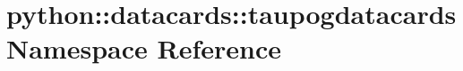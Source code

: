 \hypertarget{namespacepython_1_1datacards_1_1taupogdatacards}{
\section{python::datacards::taupogdatacards Namespace Reference}
\label{namespacepython_1_1datacards_1_1taupogdatacards}
}
